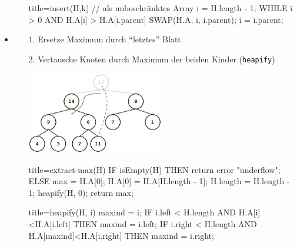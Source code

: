 \documentclass[
    12pt,
    a4paper,
    ngerman,
    color=3b,%
    marginpar=false,
    colorback=false,
    leqno,
]{tudaexercise}
\begin{document}
\begin{itemize}
\begin{itemize}
\begin{ccode}[autogobble]{title={insert(H,k) // als unbeschränktes Array}}
                    i = H.length - 1;
                    WHILE i > 0 AND H.A[i] > H.A[i.parent]
                        SWAP(H.A, i, i.parent);
                        i = i.parent;
                    \end{ccode}
            \end{itemize}
\clearpage
        \item {}
            \begin{itemize}
                \item[1.] Ersetze Maximum durch "`letztes"' Blatt
                \item[2.] Vertausche Knoten durch Maximum der beiden Kinder (\texttt{heapify})
                \item[]
                    \begin{minipage}{0.33\textwidth}
                        \includegraphics[width=6cm]{pictures/heapDelete.PNG}
                    \end{minipage} 
                    \begin{minipage}{0.57\textwidth}
                        \begin{ccode}[autogobble]{title={extract-max(H)}}
                        IF isEmpty(H) THEN return error "underflow";
                        ELSE
                            max = H.A[0];
                            H.A[0] = H.A[H.length - 1];
                            H.length = H.length - 1;
                            heapify(H, 0);
                            return max;
                        \end{ccode}
                    \end{minipage}
                \item[]
                    \begin{ccode}[autogobble]{title={heapify(H, i)}}
                    maxind = i;
                    IF i.left < H.length AND H.A[i]<H.A[i.left] THEN
                        maxind = i.left;
                    IF i.right < H.length AND H.A[maxind]<H.A[i.right] THEN
                        maxind = i.right;


\end{ccode}
\end{itemize}
\end{itemize}
\end{document}
